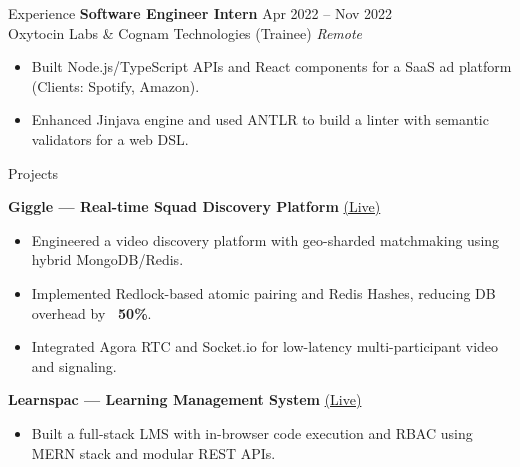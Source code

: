 \documentclass{resume}
\begin{document}
\begin{rSection}{Experience}
\textbf{Software Engineer Intern} \hfill Apr 2022 – Nov 2022\\
Oxytocin Labs \& Cognam Technologies (Trainee) \hfill \textit{Remote}
\begin{itemize}
    \itemsep-0.6em
    \item Built Node.js/TypeScript APIs and React components for a SaaS ad platform (Clients: Spotify, Amazon).
    \item Enhanced Jinjava engine and used ANTLR to build a linter with semantic validators for a web DSL.
\end{itemize}

\end{rSection}

\begin{rSection}{Projects}

\textbf{Giggle — Real-time Squad Discovery Platform} \hfill \href{https://giggle-web-git-main-razorblade42s-projects.vercel.app/}{(Live)}
\begin{itemize}
    \itemsep-0.6em
    \item Engineered a video discovery platform with geo-sharded matchmaking using hybrid MongoDB/Redis.
    \item Implemented Redlock-based atomic pairing and Redis Hashes, reducing DB overhead by \textbf{~50\%}.
    \item Integrated Agora RTC and Socket.io for low-latency multi-participant video and signaling.
\end{itemize}

\textbf{Learnspac — Learning Management System} \hfill \href{https://master.d23e6ad1u7odbc.amplifyapp.com}{(Live)}
\begin{itemize}
    \itemsep-0.6em
    \item Built a full-stack LMS with in-browser code execution and RBAC using MERN stack and modular REST APIs.
\end{itemize}

\end{rSection}
\end{document}
